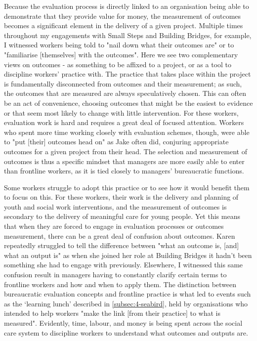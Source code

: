 Because the evaluation process is directly linked to an organisation being able to demonstrate that they provide value for money, the measurement of outcomes becomes a significant element in the delivery of a given project. Multiple times throughout my engagements with Small Steps and Building Bridges, for example, I witnessed workers being told to "nail down what their outcomes are" or to "familiarise [themselves] with the outcomes". Here we see two complementary views on outcomes - as something to be affixed to a project, or as a tool to discipline workers' practice with. The practice that takes place within the project is fundamentally disconnected from outcomes and their measurement; as such, the outcomes that are measured are always speculatively chosen. This can often be an act of convenience, choosing outcomes that might be the easiest to evidence or that seem most likely to change with little intervention. For these workers, evaluation work is hard and requires a great deal of focused attention. Workers who spent more time working closely with evaluation schemes, though, were able to "put [their] outcomes head on" as Jake often did, conjuring appropriate outcomes for a given project from their head. The selection and measurement of outcomes is thus a specific mindset that managers are more easily able to enter than frontline workers, as it is tied closely to managers' bureaucratic functions.%

Some workers struggle to adopt this practice or to see how it would benefit them to focus on this. For these workers,  their work is the delivery and planning of youth and social work interventions, and the measurement of outcomes is secondary to the delivery of meaningful care for young people. Yet this means that when they are forced to engage in evaluation processes or outcomes measurement, there can be a great deal of confusion about outcomes. Karen repeatedly struggled to tell the difference between "what an outcome is, [and] what an output is" as when she joined her role at Building Bridges it hadn't been something she had to engage with previously. Elsewhere, I witnessed this same confusion result in managers having to constantly clarify certain terms to frontline workers and how and when to apply them. The distinction between bureaucratic evaluation concepts and frontline practice is what led to events such as the `learning lunch' described in \ref{subsec:4-seabird}, held by organisations who intended to help workers "make the link [from their practice] to what is measured". Evidently, time, labour, and money is being spent across the social care system to discipline workers to understand what outcomes and outputs are.

